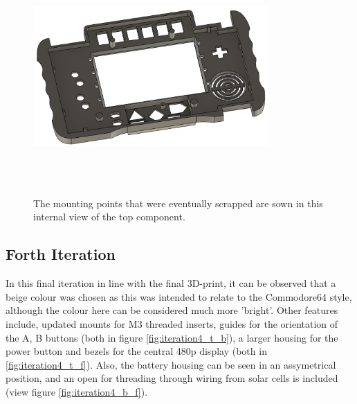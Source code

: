 \begin{figure} [h]
    \centering
    \includegraphics[width=9cm,height=9cm,keepaspectratio]{Figures/iteration3_top_back.png}
    \caption{The mounting points that were eventually scrapped are sown in this internal view of the top component.}
    \label{fig:iteration3_t_b}
\end{figure}

\subsection{Forth Iteration}

In this final iteration in line with the final 3D-print, it can be observed that a beige colour was chosen as this was intended to relate to the Commodore64 style, although the colour here can be considered much more 'bright'.
Other features include, updated mounts for M3 threaded inserts, guides for the orientation of the A, B buttons (both in figure \ref{fig:iteration4_t_b}), a larger housing for the power button and bezels for the central 480p display (both in \ref{fig:iteration4_t_f}).
Also, the battery housing can be seen in an assymetrical position, and an open for threading through wiring from solar cells is included (view figure \ref{fig:iteration4_b_f}).

